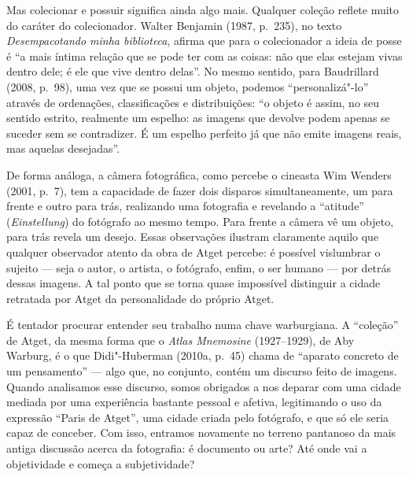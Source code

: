 Mas colecionar e possuir significa ainda algo mais. Qualquer coleção
reflete muito do caráter do colecionador. Walter Benjamin (1987, p.~235), no texto \emph{Desempacotando minha biblioteca}, afirma que para o
colecionador a ideia de posse é ``a mais íntima relação que se pode ter
com as coisas: não que elas estejam vivas dentro dele; é ele que vive
dentro delas''. No mesmo sentido, para Baudrillard (2008, p.~98), uma
vez que se possui um objeto, podemos ``personalizá"-lo'' através de
ordenações, classificações e distribuições: ``o objeto é assim, no seu
sentido estrito, realmente um espelho: as imagens que devolve podem
apenas se suceder sem se contradizer. É um espelho perfeito já que não
emite imagens reais, mas aquelas desejadas''.

De forma análoga, a câmera fotográfica, como
percebe o cineasta Wim Wenders (2001, p.~7), tem a capacidade de fazer dois
disparos simultaneamente, um para frente e outro para trás, realizando
uma fotografia e revelando a ``atitude'' (\emph{Einstellung}) do
fotógrafo ao mesmo tempo. Para frente a câmera vê um objeto, para trás
revela um desejo. Essas observações ilustram claramente aquilo que
qualquer observador atento da obra de Atget percebe: é possível
vislumbrar o sujeito --- seja o autor, o artista, o fotógrafo, enfim, o
ser humano --- por detrás dessas imagens. A tal ponto que se torna quase
impossível distinguir a cidade retratada por Atget da personalidade do
próprio Atget.

É tentador procurar entender seu trabalho numa chave warburgiana. A
``coleção'' de Atget, da mesma forma que o \emph{Atlas Mnemosine}
(1927--1929), de Aby Warburg, é o que Didi"-Huberman (2010a, p.~45) chama
de ``aparato concreto de um pensamento'' --- algo que, no conjunto,
contém um discurso feito de imagens. Quando analisamos esse discurso,
somos obrigados a nos deparar com uma cidade mediada por uma experiência
bastante pessoal e afetiva, legitimando o uso da expressão ``Paris de
Atget'', uma cidade criada pelo fotógrafo, e que só ele seria capaz de
conceber. Com isso, entramos novamente no terreno pantanoso da mais
antiga discussão acerca da fotografia: é documento ou arte? Até onde vai
a objetividade e começa a subjetividade?

